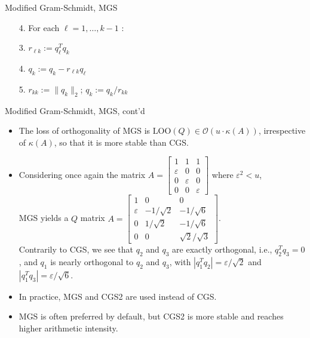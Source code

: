\documentclass[t,usepdftitle=false]{beamer}
\begin{document}
\begin{frame}{Modified Gram-Schmidt, MGS}
\begin{itemize}
\begin{itemize}
\item[4.]\hspace{.4cm}For each $\ell=1,\dots,k-1$ :\vspace{.1cm}
\item[3.]\hspace{.8cm}$r_{\ell k}:=q_\ell^Tq_k${\color{gray}{ // BLAS 1}}\vspace{.1cm}
\item[4.]\hspace{.8cm}$q_k:=q_k-r_{\ell k}q_\ell${\color{gray}{ // BLAS 1}}\vspace{.1cm}
\item[5.]\hspace{.4cm}$r_{kk}:=\|q_k\|_2$; $q_{k}:=q_k/r_{kk}$
\end{itemize}
\end{itemize}
\end{frame}

\begin{frame}{Modified Gram-Schmidt, MGS, cont'd}
\begin{itemize}
\item The loss of orthogonality of MGS is $\mathrm{LOO}(Q)\in\mathcal{O}(u\cdot\kappa(A))$, irrespective of $\kappa(A)$, so that it is more stable than CGS.
\item Considering once again the matrix $A=\begin{bmatrix}1&1&1\\\varepsilon&0&0\\0&\varepsilon&0\\0&0&\varepsilon\end{bmatrix}$ where $\varepsilon^2<u$,\vspace{.2cm}\\
MGS yields a $Q$ matrix $A=\begin{bmatrix}1&0&0\\\varepsilon&-1/\sqrt{2}&-1/\sqrt{6}\\0&1/\sqrt{2}&-1/\sqrt{6}\\0&0&\sqrt{2}/\sqrt{3}\end{bmatrix}$.\vspace{.4cm}\\
Contrarily to CGS, we see that $q_2$ and $q_3$ are exactly orthogonal, i.e., $q_2^Tq_3=0$,
and $q_1$ is nearly orthogonal to $q_2$ and $q_3$, with $|q_1^Tq_2|=\varepsilon/\sqrt{2}$ and $|q_1^Tq_3|=\varepsilon/\sqrt{6}$.
\item In practice, MGS and CGS2 are used instead of CGS.
\item MGS is often preferred by default, but CGS2 is more stable and reaches higher arithmetic intensity.
\end{itemize}
\end{frame}
\end{document}
